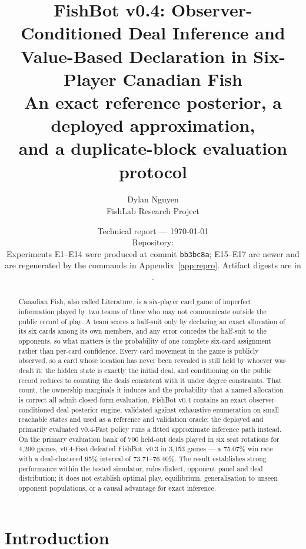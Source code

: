 \documentclass[11pt]{article}
\title{\textbf{FishBot v0.4: Observer-Conditioned Deal Inference and\\
Value-Based Declaration in Six-Player Canadian Fish}\\[5pt]
\large An exact reference posterior, a deployed approximation,\\
and a duplicate-block evaluation protocol}
\author{Dylan Nguyen\\\small FishLab Research Project}
\date{%
  \small Technical report --- \today\\[2pt]
  \small Repository: \filepath{https://github.com/dylann29/fish-optimization}\\[1pt]
  \small Experiments E1--E14 were produced at commit \texttt{bb3bc8a};
  E15--E17 are newer and are regenerated by the commands in
  Appendix~\ref{app:repro}. Artifact digests are in
  \filepath{research/v04/results/MANIFEST.json}.%
}
\theoremstyle{definition}
\DeclareRobustCommand{\vfast}{\texorpdfstring{\mbox{v0.4-Fast}}{v0.4-Fast}}
\DeclareRobustCommand{\vthree}{\texorpdfstring{\mbox{FishBot v0.3}}{FishBot v0.3}}
\newcommand{\numHtHGames}{4{,}200}
\newcommand{\numHtHDeals}{700}
\newcommand{\numVsVthree}{75.07}
\newcommand{\numVsVthreeCI}{73.71--76.40}
\newcommand{\numVsVthreeWins}{3{,}153}
\begin{document}
\maketitle
\thispagestyle{fancy}

\begin{abstract}
Canadian Fish, also called Literature, is a six-player card game of imperfect
information played by two teams of three who may not communicate outside the
public record of play. A team scores a half-suit only by declaring an exact
allocation of its six cards among its own members, and any error concedes the
half-suit to the opponents, so what matters is the probability of one complete
six-card assignment rather than per-card confidence. Every card
movement in the game is publicly observed, so a card whose location has never
been revealed is still held by whoever was dealt it: the hidden state is exactly
the initial deal, and conditioning on the public record reduces to counting the
deals consistent with it under degree constraints. That count, the ownership
marginals it induces and the probability that a named allocation is correct all
admit closed-form evaluation. FishBot v0.4 contains an exact observer-conditioned deal-posterior
engine, validated against exhaustive enumeration on small reachable states and
used as a reference and validation oracle; the deployed and primarily evaluated \vfast{} policy runs a
fitted approximate inference path instead. On the primary evaluation bank of
\numHtHDeals{} held-out deals played in six seat rotations for \numHtHGames{}
games, \vfast{} defeated \vthree{} in \numVsVthreeWins{} games --- a
\numVsVthree\% win rate with a deal-clustered 95\% interval of
\numVsVthreeCI\%. The result establishes strong performance within the tested
simulator, rules dialect, opponent panel and deal distribution; it does not
establish optimal play, equilibrium, generalisation to unseen opponent
populations, or a causal advantage for exact inference.
\end{abstract}

\section{Introduction}
\end{document}
